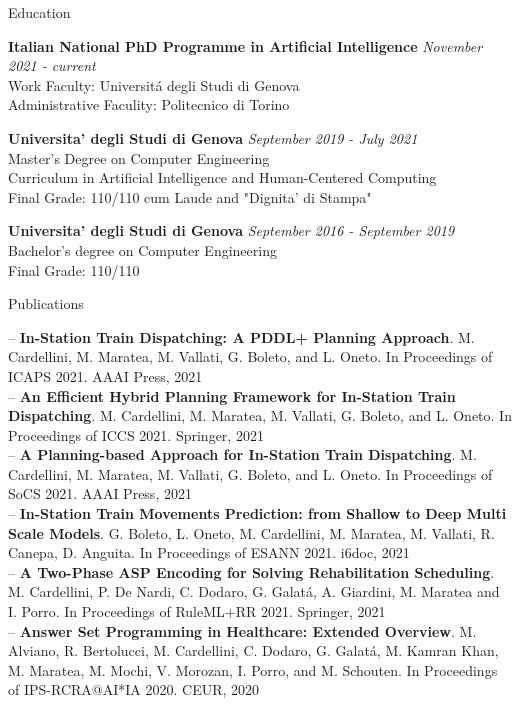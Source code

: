 \documentclass{resume} %
\begin{document}

\begin{rSection}{Education}

{\bf  Italian National PhD Programme in Artificial Intelligence} \hfill {\em November 2021 - \textit{current}} \\ 
Work Faculty: Universit\'a degli Studi di Genova\\
Administrative Faculity: Politecnico di Torino 

{\bf Universita' degli Studi di Genova} \hfill {\em September 2019 - July 2021} \\ 
Master's Degree on Computer Engineering \\
Curriculum in Artificial Intelligence and Human-Centered Computing \\
Final Grade: 110/110 cum Laude and "Dignita' di Stampa" 

{\bf Universita' degli Studi di Genova} \hfill {\em September 2016 - September 2019} \\ 
Bachelor's degree on Computer Engineering \\
Final Grade: 110/110 
\end{rSection}



\begin{rSection}{Publications}

-- \textbf{In-Station Train Dispatching: A PDDL+ Planning Approach}. M. Cardellini, M. Maratea, M. Vallati, G. Boleto, and L. Oneto. In Proceedings of ICAPS 2021. AAAI Press, 2021 \\
-- \textbf{An Efficient Hybrid Planning Framework for In-Station Train Dispatching}. M. Cardellini, M. Maratea, M. Vallati, G. Boleto, and L. Oneto. In Proceedings of ICCS 2021. Springer, 2021 \\
-- \textbf{A Planning-based Approach for In-Station Train Dispatching}. M. Cardellini, M. Maratea, M. Vallati, G. Boleto, and L. Oneto. In Proceedings of SoCS 2021. AAAI Press, 2021\\
-- \textbf{In-Station Train Movements Prediction: from Shallow to Deep Multi Scale Models}. G. Boleto, L. Oneto, M. Cardellini, M. Maratea, M. Vallati, R. Canepa, D. Anguita. In Proceedings of ESANN 2021. i6doc, 2021\\
-- \textbf{A Two-Phase ASP Encoding for Solving Rehabilitation Scheduling}. M. Cardellini, P. De Nardi, C. Dodaro, G. Galat\'a, A. Giardini, M. Maratea and I. Porro. In Proceedings of RuleML+RR 2021. Springer, 2021\\
-- \textbf{Answer Set Programming in Healthcare: Extended Overview}. M. Alviano, R. Bertolucci, M. Cardellini, C. Dodaro, G. Galat\'a, M. Kamran Khan, M. Maratea, M. Mochi, V. Morozan, I. Porro, and M. Schouten. In Proceedings of IPS-RCRA@AI*IA 2020. CEUR, 2020
\end{rSection}
\end{document}
